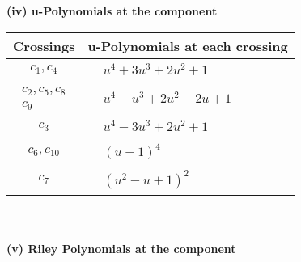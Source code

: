 \documentclass[1p]{elsarticle_modified}
\theoremstyle{definition}
\begin{document}
\newpage\renewcommand{\arraystretch}{1}
\flushleft \textbf{(iv) u-Polynomials at the component}\newline \\
\begin{tabular}{m{50pt}|m{274pt}}
Crossings & \hspace{64pt}u-Polynomials at each crossing \\
\hline $$\begin{aligned}c_{1},c_{4}\end{aligned}$$&$\begin{aligned}
&u^4+3 u^3+2 u^2+1
\end{aligned}$\\
\hline $$\begin{aligned}c_{2},c_{5},c_{8}\\c_{9}\end{aligned}$$&$\begin{aligned}
&u^4- u^3+2 u^2-2 u+1
\end{aligned}$\\
\hline $$\begin{aligned}c_{3}\end{aligned}$$&$\begin{aligned}
&u^4-3 u^3+2 u^2+1
\end{aligned}$\\
\hline $$\begin{aligned}c_{6},c_{10}\end{aligned}$$&$\begin{aligned}
&(u-1)^4
\end{aligned}$\\
\hline $$\begin{aligned}c_{7}\end{aligned}$$&$\begin{aligned}
&(u^2- u+1)^2
\end{aligned}$\\
\hline
\end{tabular}\\~\\
\newpage\renewcommand{\arraystretch}{1}
\flushleft \textbf{(v) Riley Polynomials at the component}\newline \\
\end{document}
